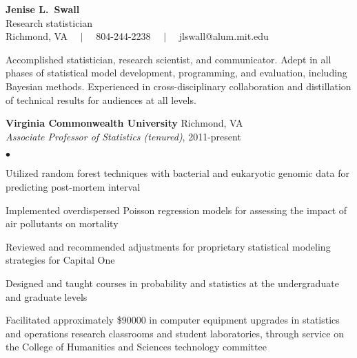 \documentclass[11pt]{article}
\def\newsectn{\vspace*{0.6cm}}
\def\newempl{\vspace*{0.4cm}}
\begin{document}
\thispagestyle{empty}


\begin{center}
{\Large{\textbf{Jenise L.~Swall}}}\\
{\Large{Research statistician}}\\ \vspace*{0.05in}
Richmond, VA $\quad | \quad$ 804-244-2238 $\quad | \quad$ jlswall@alum.mit.edu\\
\hrulefill
\end{center}






Accomplished statistician, research scientist, and communicator.  Adept in all
phases of statistical model development, programming, and evaluation, including
Bayesian methods. Experienced in cross-disciplinary collaboration and
distillation of technical results for audiences at all levels.



\newsectn
{} 


\textbf{Virginia Commonwealth University}  \hfill Richmond, VA\\
\textit{Associate Professor of Statistics (tenured)}, 2011-present

\begin{list}{$\bullet$}{
\setlength{\topsep}{0cm}
\setlength{\partopsep}{0cm}
\setlength{\parsep}{0cm}
\setlength{\itemsep}{0cm}
\setlength{\labelsep}{1ex}
\setlength{\labelwidth}{1em}
\setlength{\leftmargin}{1em}
}
\item Utilized random forest techniques with bacterial and eukaryotic genomic data for predicting
post-mortem interval 
\item Implemented overdispersed Poisson regression models for assessing the impact of air pollutants on mortality
\item Reviewed and recommended adjustments for proprietary statistical
  modeling strategies for Capital One
\item Designed and taught courses in probability and statistics at the
undergraduate and graduate levels
\item Facilitated approximately \$90000 in computer equipment upgrades in statistics and operations research classrooms and student laboratories, through service on the College of Humanities and Sciences technology committee 
\end{list}
\end{document}
